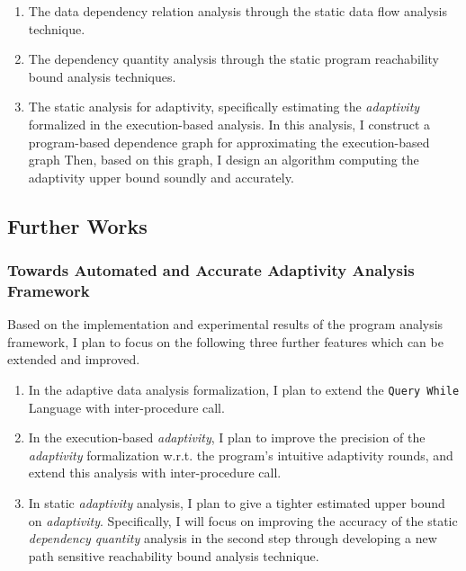\begin{enumerate}
\begin{enumerate}
\item The data dependency relation analysis through the static data flow analysis technique.
\item The dependency quantity analysis through the static program reachability bound analysis techniques.
\item 
The static analysis for adaptivity, specifically estimating the \emph{adaptivity} formalized in the execution-based analysis.
In this analysis, I construct a program-based dependence graph for approximating the execution-based graph
Then, based on this graph, I design an algorithm
computing the adaptivity upper bound soundly 
and accurately.
\end{enumerate}
\end{enumerate}%


\subsection{Further Works}
\subsubsection{Towards Automated and Accurate Adaptivity Analysis Framework}

\label{subsec:intro-improve}
Based on the implementation and experimental results of the program analysis framework,
I plan to focus on the following three further features which can be extended and improved.
\begin{enumerate}
    \item In the adaptive data analysis formalization, I plan to extend the {\tt Query While} Language with inter-procedure call.
    \item In the execution-based \emph{adaptivity},
    I plan to improve the precision of the \emph{adaptivity} formalization w.r.t. the program's intuitive adaptivity rounds,
and extend this analysis with inter-procedure call.
\item In static \emph{adaptivity} analysis, I plan to give a tighter estimated upper bound on \emph{adaptivity}.
Specifically, I will focus on improving the accuracy of the static \emph{dependency quantity} analysis in the second step through 
developing a new path sensitive reachability bound analysis technique. 
\end{enumerate}
